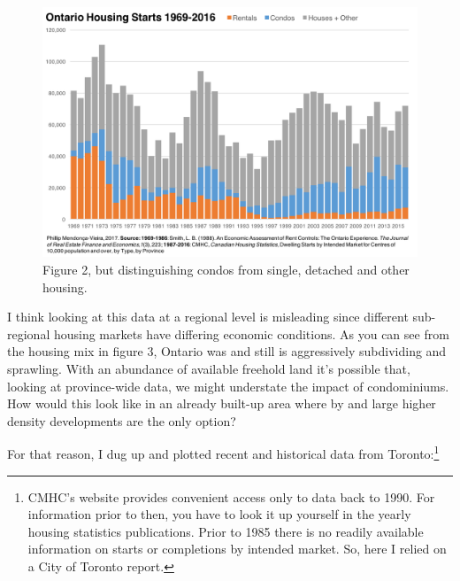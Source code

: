 \begin{figure}[ht]
\centering 
\includegraphics[width=\textwidth]{Ontario_Housing_Starts_1969-2016_With_Condos.png}
\caption[Ontario housing starts by intended market and condos 1969-2016]{Figure 2, but distinguishing condos from single, detached and other housing.
}
\label{fig:figure3} 
\end{figure}

I think looking at this data at a regional level is misleading since different sub-regional housing markets have differing economic conditions. As you can see from the housing mix in figure 3, Ontario was and still is aggressively subdividing and sprawling. With an abundance of available freehold land it's possible that, looking at province-wide data, we might understate the impact of condominiums. How would this look like in an already built-up area where by and large higher density developments are the only option? 

For that reason, I dug up and plotted recent and historical data from Toronto:\footnote{\label{^note-digging} CMHC's website provides convenient access only to data back to 1990. For information prior to then, you have to look it up yourself in the yearly housing statistics publications. Prior to 1985 there is no readily available information on starts or completions by intended market. So, here I relied on a City of Toronto report. }


